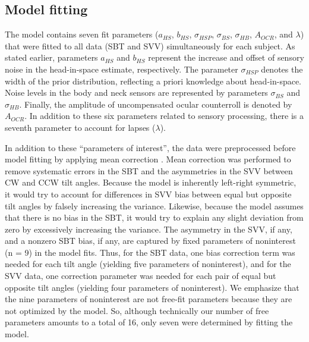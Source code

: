 \subsection{Model fitting}

The model contains seven fit parameters ($a_{HS}$, $b_{HS}$, $\sigma_{HSP}$, $\sigma_{BS}$, $\sigma_{HB}$, $A_{OCR}$, and $\lambda$) that were fitted to all data (SBT and SVV) simultaneously for each subject. As stated earlier, parameters $a_{HS}$ and $b_{HS}$ represent the increase and offset of sensory noise in the head-in-space estimate, respectively. The parameter $\sigma_{HSP}$ denotes the width of the prior distribution, reflecting a priori knowledge about head-in-space. Noise levels in the body and neck sensors are represented by parameters $\sigma_{BS}$ and $\sigma_{HB}$. Finally, the amplitude of uncompensated ocular counterroll is denoted by $A_{OCR}$. In addition to these six parameters related to sensory processing, there is a seventh parameter to account for lapses ($\lambda$). 

In addition to these ``parameters of interest'', the data were preprocessed before model fitting by applying mean correction \cite{mcguire2009}. Mean correction was performed to remove systematic errors in the SBT and the asymmetries in the SVV between CW and CCW tilt angles. Because the model is inherently left-right symmetric, it would try to account for differences in SVV bias between equal but opposite tilt angles by falsely increasing the variance. Likewise, because the model assumes that there is no bias in the SBT, it would try to explain any slight deviation from zero by excessively increasing the variance. The asymmetry in the SVV, if any, and a nonzero SBT bias, if any, are captured by fixed parameters of noninterest (n = 9) in the model fits. Thus, for the SBT data, one bias correction term was needed for each tilt angle (yielding five parameters of noninterest), and for the SVV data, one correction parameter was needed for each pair of equal but opposite tilt angles (yielding four parameters of noninterest). We emphasize that the nine parameters of noninterest are not free-fit parameters because they are not optimized by the model. So, although technically our number of free parameters amounts to a total of 16, only seven were determined by fitting the model. 


